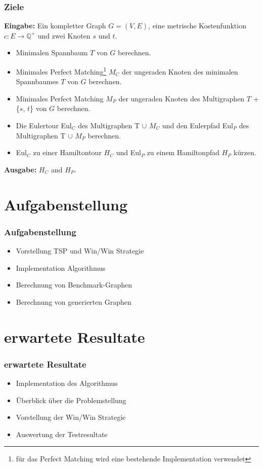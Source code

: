 \documentclass[12pt]{beamer}
\begin{document}
	\begin{frame}
        \frametitle{Ziele}
		\begin{scriptsize}
		\textbf{Eingabe:} Ein kompletter Graph $G = (V,E)$, eine metrische Kostenfunktion $c: E \rightarrow \mathbb{Q}^+$ und zwei Knoten $s$ und $t$.
		
		\begin{itemize}
			\item[1.] Minimalen Spannbaum $T$ von $G$ berechnen.
			\item[2.] Minimales Perfect Matching\footnote{für das Perfect Matching wird eine bestehende Implementation verwendet} $M_C$ der ungeraden Knoten des minimalen Spannbaumes $T$ von $G$ berechnen.
			\item[3.] Minimales Perfect Matching $M_P$ der ungeraden Knoten des Multigraphen $T$ + \{$s$, $t$\} von $G$ berechnen.
			\item[4.] Die Eulertour Eul$_C$ des Multigraphen T $\cup$ $M_C$ und den Eulerpfad Eul$_P$ des Multigraphen T $\cup$ $M_P$ berechnen.
			\item[5.] Eul$_C$ zu einer Hamiltontour $H_C$ und Eul$_P$ zu einem Hamiltonpfad $H_P$ kürzen.  
		\end{itemize}
	\textbf{Ausgabe:} $H_C$ and $H_P$.
	\end{scriptsize}
    \end{frame}

	\section{Aufgabenstellung}
	\begin{frame}
        \frametitle{Aufgabenstellung}
		\begin{itemize}
			\item Vorstellung TSP und Win/Win Strategie
			\item Implementation Algorithmus
			\item Berechnung von Benchmark-Graphen
			\item Berechnung von generierten Graphen
		\end{itemize}
    \end{frame}

	\section{erwartete Resultate}
	\begin{frame}
        \frametitle{erwartete Resultate}
		\begin{itemize}
			\item Implementation des Algorithmus
			\item Überblick über die Problemstellung
			\item Vorstellung der Win/Win Strategie
			\item Auswertung der Testresultate
		\end{itemize}
    \end{frame}
\end{document}
